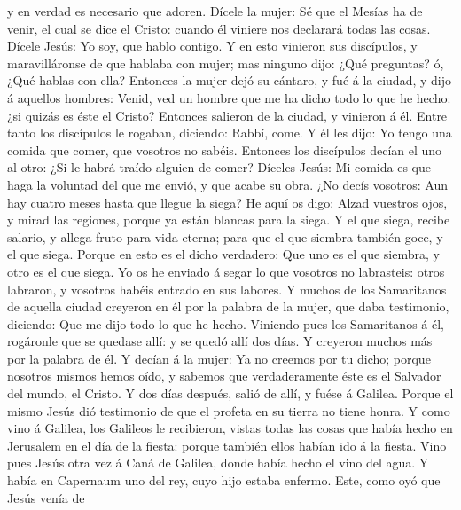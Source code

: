 y en verdad es necesario que adoren.  Dícele la mujer: Sé
que el Mesías ha de venir, el cual se dice el Cristo: cuando él viniere
nos declarará todas las cosas.  Dícele Jesús: Yo soy, que
hablo contigo.  Y en esto vinieron sus discípulos, y
maravilláronse de que hablaba con mujer; mas ninguno dijo: ¿Qué
preguntas? ó, ¿Qué hablas con ella?  Entonces la mujer dejó
su cántaro, y fué á la ciudad, y dijo á aquellos hombres: 
Venid, ved un hombre que me ha dicho todo lo que he hecho: ¿si quizás es
éste el Cristo?  Entonces salieron de la ciudad, y vinieron
á él.  Entre tanto los discípulos le rogaban, diciendo:
Rabbí, come.  Y él les dijo: Yo tengo una comida que comer,
que vosotros no sabéis.  Entonces los discípulos decían el
uno al otro: ¿Si le habrá traído alguien de comer?  Díceles
Jesús: Mi comida es que haga la voluntad del que me envió, y que acabe
su obra.  ¿No decís vosotros: Aun hay cuatro meses hasta
que llegue la siega? He aquí os digo: Alzad vuestros ojos, y mirad las
regiones, porque ya están blancas para la siega.  Y el que
siega, recibe salario, y allega fruto para vida eterna; para que el que
siembra también goce, y el que siega.  Porque en esto es el
dicho verdadero: Que uno es el que siembra, y otro es el que siega.
 Yo os he enviado á segar lo que vosotros no labrasteis:
otros labraron, y vosotros habéis entrado en sus labores. 
Y muchos de los Samaritanos de aquella ciudad creyeron en él por la
palabra de la mujer, que daba testimonio, diciendo: Que me dijo todo lo
que he hecho.  Viniendo pues los Samaritanos á él,
rogáronle que se quedase allí: y se quedó allí dos días.  Y
creyeron muchos más por la palabra de él.  Y decían á la
mujer: Ya no creemos por tu dicho; porque nosotros mismos hemos oído, y
sabemos que verdaderamente éste es el Salvador del mundo, el Cristo.
 Y dos días después, salió de allí, y fuése á Galilea.
 Porque el mismo Jesús dió testimonio de que el profeta en
su tierra no tiene honra.  Y como vino á Galilea, los
Galileos le recibieron, vistas todas las cosas que había hecho en
Jerusalem en el día de la fiesta: porque también ellos habían ido á la
fiesta.  Vino pues Jesús otra vez á Caná de Galilea, donde
había hecho el vino del agua. Y había en Capernaum uno del rey, cuyo
hijo estaba enfermo.  Este, como oyó que Jesús venía de
